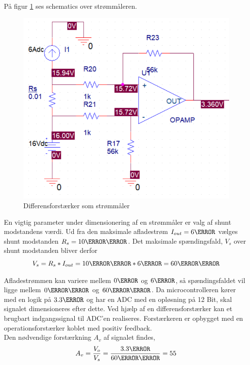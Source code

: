 På figur \ref{fig:current_sense} ses schematics over strømmåleren.
\begin{figure}[h]
	\centering
	\includegraphics[width=15cm]{billeder/current_sense.png}
	\caption{Differensforstærker som strømmåler}
	\label{fig:current_sense}
\end{figure}

En vigtig parameter under dimensionering af en strømmåler er valg af shunt modstandens værdi. Ud fra den maksimale afladestrøm $I_{out} = 6\ampere$ vælges shunt modstanden $R_{s} = 10\milli\ohm$. Det maksimale spændingsfald, $V_{s}$ over shunt modstanden bliver derfor
\begin {equation} 
V_{s} = R_{s} * I_{out} = 10\milli\ohm * 6\ampere = 60\milli\volt
\end {equation}

Afladestrømmen kan variere mellem $0\ampere$ og $6\ampere$, så spændingsfaldet vil ligge mellem $0\milli\volt$ og $60\milli\volt$. Da microcontrolleren kører med en logik på $3.3\volt$ og har en ADC med en opløsning på 12 Bit, skal signalet dimensioneres efter dette. Ved hjælp af en differensforstærker kan et brugbart indgangssignal til ADC'en realiseres. Forstærkeren er opbygget med en operationsforstærker koblet med positiv feedback.
\\

Den nødvendige forstærkning $A_{v}$ af signalet findes,
\begin {equation} 
A_{v} = \frac{V_{o}}{V_{s}} = \frac{3.3\volt}{60\milli\volt} = 55
\end {equation}

